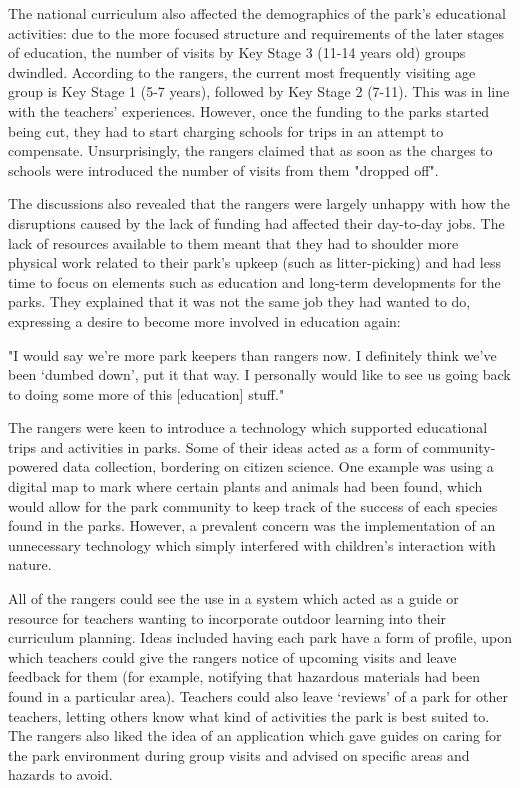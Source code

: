 The national curriculum also affected the demographics of the park’s educational activities: due to the more focused structure and requirements of the later stages of education, the number of visits by Key Stage 3 (11-14 years old) groups dwindled. According to the rangers, the current most frequently visiting age group is Key Stage 1 (5-7 years), followed by Key Stage 2 (7-11). This was in line with the teachers’ experiences. However, once the funding to the parks started being cut, they had to start charging schools for trips in an attempt to compensate. Unsurprisingly, the rangers claimed that as soon as the charges to schools were introduced the number of visits from them "dropped off".

The discussions also revealed that the rangers were largely unhappy with how the disruptions caused by the lack of funding had affected their day-to-day jobs. The lack of resources available to them meant that they had to shoulder more physical work related to their park’s upkeep (such as litter-picking) and had less time to focus on elements such as education and long-term developments for the parks. They explained that it was not the same job they had wanted to do, expressing a desire to become more involved in education again:

\begin{displayquote}
"I would say we're more park keepers than rangers now. I definitely think we've been `dumbed down', put it that way. I personally would like to see us going back to doing some more of this [education] stuff."
\end{displayquote}

The rangers were keen to introduce a technology which supported educational trips and activities in parks. Some of their ideas acted as a form of community-powered data collection, bordering on citizen science. One example was using a digital map to mark where certain plants and animals had been found, which would allow for the park community to keep track of the success of each species found in the parks. However, a prevalent concern was the implementation of an unnecessary technology which simply interfered with children’s interaction with nature.

All of the rangers could see the use in a system which acted as a guide or resource for teachers wanting to incorporate outdoor learning into their curriculum planning. Ideas included having each park have a form of profile, upon which teachers could give the rangers notice of upcoming visits and leave feedback for them (for example, notifying that hazardous materials had been found in a particular area). Teachers could also leave `reviews' of a park for other teachers, letting others know what kind of activities the park is best suited to. The rangers also liked the idea of an application which gave guides on caring for the park environment during group visits and advised on specific areas and hazards to avoid.


